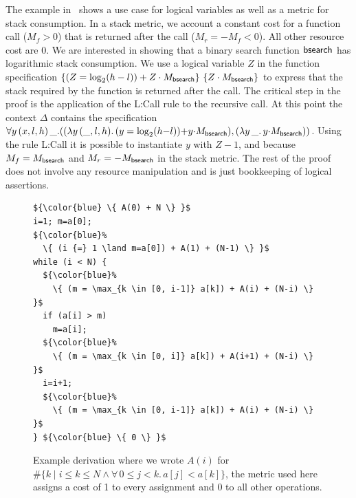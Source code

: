 \documentclass[nocopyrightspace,preprint]{sigplanconf}
\newcommand{\pref}[1]{\prettyref{#1}}
\begin{document}
The example in~\pref{fig:xmplbs} shows a use case for logical
variables as well as a metric for stack consumption. In a stack
metric, we account a constant cost for a function call ($M_f>0$) that
is returned after the call ($M_r = -M_f <0$).  All other resource cost
are $0$.  We are interested in showing that a binary search function
$\mathsf{bsearch}$ has logarithmic stack consumption.  We use a logical
variable $Z$ in the function specification $\{(Z = \log_2(h-l))
  + Z \cdot M_{\mathsf{bsearch}}\}\, \, \{Z \cdot M_{\mathsf{bsearch}}\}$ to express that the stack required by the
function is returned after the call.
%
The critical step in the proof is the application of the
{\sc L:Call} rule to the recursive call.  At this point
the context $\Delta$ contains the specification
$
  \forall y \, (x,l,h) \, \_.
  ( (\lambda y \, (\_, l, h) .\, (y = \log_2(h {-} l)) {+} y {\cdot} M_{\mathsf{bsearch}})
  , (\lambda y \, \_ .\, y {\cdot} M_{\mathsf{bsearch}})
  )
$.
%
Using the rule {\sc L:Call} it is possible to instantiate $y$ with $Z
- 1$, and because $M_f = M_{\mathsf{bsearch}}$ and $M_r =
-M_{\mathsf{bsearch}}$ in the stack metric.  The rest of the proof does
not involve any resource manipulation and is just bookkeeping of
logical assertions.



\begin{figure}
\begin{lstlisting}
${\color{blue} \{ A(0) + N \} }$
i=1; m=a[0];
${\color{blue}%
  \{ (i {=} 1 \land m=a[0]) + A(1) + (N-1) \} }$
while (i < N) {
  ${\color{blue}%
    \{ (m = \max_{k \in [0, i-1]} a[k]) + A(i) + (N-i) \} }$
  if (a[i] > m)
    m=a[i];
  ${\color{blue}%
    \{ (m = \max_{k \in [0, i]} a[k]) + A(i+1) + (N-i) \} }$
  i=i+1;
  ${\color{blue}%
    \{ (m = \max_{k \in [0, i-1]} a[k]) + A(i) + (N-i) \} }$
} ${\color{blue} \{ 0 \} }$
\end{lstlisting}
\caption{Example derivation where we wrote $A(i)$
  for $\#\{ k \mid i \le k \le N \land \forall\, 0\le j<k.\, a[j] < a[k]\}$,
  the metric used here assigns a cost of 1 to every assignment
  and 0 to all other operations.
  }
\label{fig:xmplmax}
\end{figure}
\end{document}
